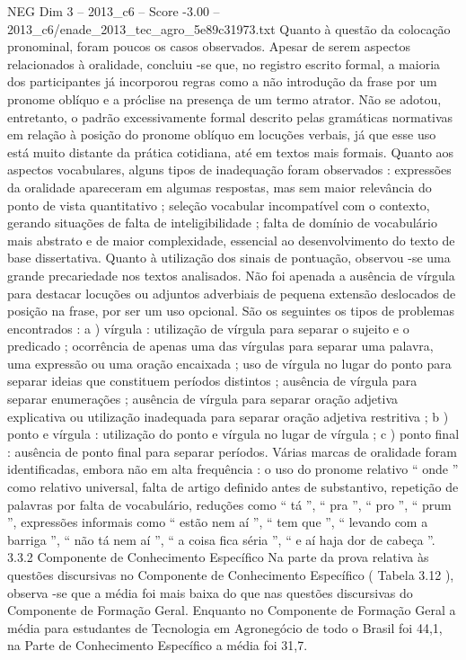 \begin{textsample}{NEG Dim 3 – 2013\_c6 – Score -3.00 – 2013\_c6/enade\_2013\_tec\_agro\_5e89c31973.txt}
Quanto à questão da colocação pronominal, foram poucos os casos observados.
Apesar de serem aspectos relacionados à oralidade, concluiu -se que, no registro escrito formal, a maioria dos participantes já incorporou regras como a não introdução da frase por um pronome oblíquo e a próclise na presença de um termo atrator.
Não se adotou, entretanto, o padrão excessivamente formal descrito pelas gramáticas normativas em relação à posição do pronome oblíquo em locuções verbais, já que esse uso está muito distante da prática cotidiana, até em textos mais formais.
Quanto aos aspectos vocabulares, alguns tipos de inadequação foram observados : expressões da oralidade apareceram em algumas respostas, mas sem maior relevância do ponto de vista quantitativo ; seleção vocabular incompatível com o contexto, gerando situações de falta de inteligibilidade ; falta de domínio de vocabulário mais abstrato e de maior complexidade, essencial ao desenvolvimento do texto de base dissertativa.
Quanto à utilização dos sinais de pontuação, observou -se uma grande precariedade nos textos analisados.
Não foi apenada a ausência de vírgula para destacar locuções ou adjuntos adverbiais de pequena extensão deslocados de posição na frase, por ser um uso opcional.
São os seguintes os tipos de problemas encontrados : a ) vírgula : utilização de vírgula para separar o sujeito e o predicado ; ocorrência de apenas uma das vírgulas para separar uma palavra, uma expressão ou uma oração encaixada ; uso de vírgula no lugar do ponto para separar ideias que constituem períodos distintos ; ausência de vírgula para separar enumerações ; ausência de vírgula para separar oração adjetiva explicativa ou utilização inadequada para separar oração adjetiva restritiva ; b ) ponto e vírgula : utilização do ponto e vírgula no lugar de vírgula ; c ) ponto final : ausência de ponto final para separar períodos.
Várias marcas de oralidade foram identificadas, embora não em alta frequência : o uso do pronome relativo “ onde ” como relativo universal, falta de artigo definido antes de substantivo, repetição de palavras por falta de vocabulário, reduções como “ tá ”, “ pra ”, “ pro ”, “ prum ”, expressões informais como “ estão nem aí ”, “ tem que ”, “ levando com a barriga ”, “ não tá nem aí ”, “ a coisa fica séria ”, “ e aí haja dor de cabeça ”. 3.3.2 Componente de Conhecimento Específico Na parte da prova relativa às questões discursivas no Componente de Conhecimento Específico ( Tabela 3.12 ), observa -se que a média foi mais baixa do que nas questões discursivas do Componente de Formação Geral.
Enquanto no Componente de Formação Geral a média para estudantes de Tecnologia em Agronegócio de todo o Brasil foi 44,1, na Parte de Conhecimento Específico a média foi 31,7.

\end{textsample}
